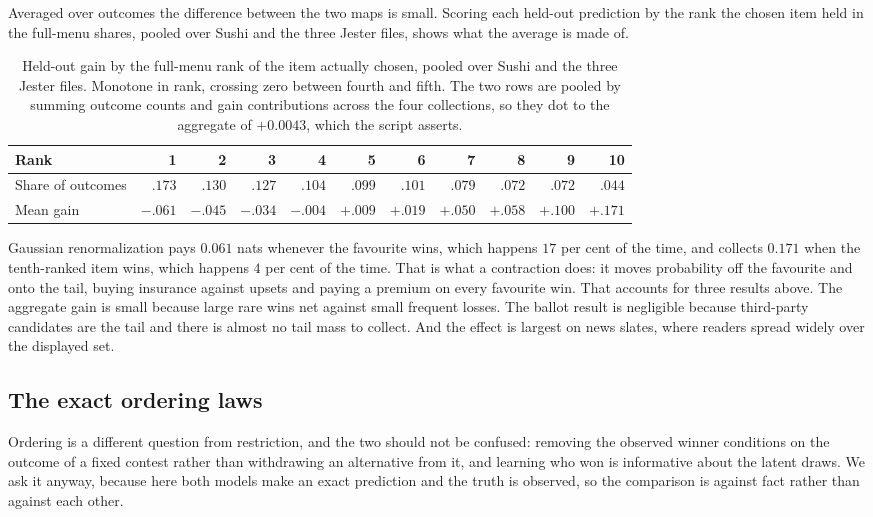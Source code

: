 \documentclass[11pt]{article}
\theoremstyle{italichead}
\begin{document}
Averaged over outcomes the difference between the two maps is small. Scoring each held-out
prediction by the rank the chosen item held in the full-menu shares, pooled over Sushi and
the three Jester files, shows what the average is made of.

\begin{table}[htbp]
\centering
\small
\setlength{\tabcolsep}{4pt}
\begin{tabular}{lrrrrrrrrrr}
\toprule
Rank & 1 & 2 & 3 & 4 & 5 & 6 & 7 & 8 & 9 & 10 \\
\midrule
Share of outcomes & $.173$ & $.130$ & $.127$ & $.104$ & $.099$ & $.101$ & $.079$ & $.072$ & $.072$ & $.044$ \\
Mean gain & $-.061$ & $-.045$ & $-.034$ & $-.004$ & $+.009$ & $+.019$ & $+.050$ & $+.058$ & $+.100$ & $+.171$ \\
\bottomrule
\end{tabular}
\caption{Held-out gain by the full-menu rank of the item actually chosen, pooled over Sushi
and the three Jester files. Monotone in rank, crossing zero between fourth and fifth. The two
rows are pooled by summing outcome counts and gain contributions across the four
collections, so they dot to the aggregate of $+0.0043$, which the script asserts.}
\label{tab:byrank}
\end{table}

Gaussian renormalization pays $0.061$ nats whenever the favourite wins, which happens $17$ per
cent of the time, and collects $0.171$ when the tenth-ranked item wins, which happens $4$ per
cent of the time. That is what a contraction does: it moves probability off the favourite and onto the
tail, buying insurance against upsets and paying a premium on every favourite win. That accounts
for three results above. The aggregate gain is small because large rare wins net against
small frequent losses. The ballot result is negligible because third-party candidates are the
tail and there is almost no tail mass to collect. And the effect is largest on news slates,
where readers spread widely over the displayed set.

\subsection{The exact ordering laws}
\label{sec:sequential}

Ordering is a different question from restriction, and the two should not be confused: removing
the observed winner conditions on the outcome of a fixed contest rather than withdrawing an
alternative from it, and learning who won is informative about the latent draws. We ask it anyway, because here
both models make an exact prediction and the truth is observed, so the comparison is against
fact rather than against each other.
\end{document}
